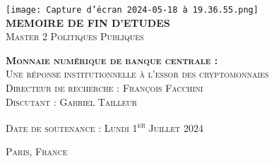 \documentclass[12pt]{article}
\begin{document}
\begin{titlepage}
    \begin{center}
        \vspace*{1cm}

        \texttt{[image: Capture d’écran 2024-05-18 à 19.36.55.png]}\\[2cm] %

        \textsc{\LARGE \textbf {MEMOIRE DE FIN D'ETUDES}}\\[0.1cm]
        \textsc{\Large Master 2 Politiques Publiques}
        \vfill

        \hrulefill

        \vfill

        \textsc{\LARGE \textbf {Monnaie numérique de banque centrale :}}\\[0.2cm]
        \textsc{\Large Une réponse institutionnelle à l'essor des cryptomonnaies}\\[2.5cm]


        \textsc{\Large Directeur de recherche : François Facchini}\\[0.3cm]

        \textsc{\Large Discutant : Gabriel Tailleur}\\[0.5cm]
        \vfill

        \textsc{\large Date de soutenance : Lundi 1\textsuperscript{er} Juillet 2024}\\[1cm]

        \hrulefill

        \vfill

        \textsc{\large Paris, France}\\[0.5cm]

    \end{center}
\end{titlepage}

\tableofcontents


\clearpage

\pagestyle{fancy}
\fancyhf{}

\title{}
\author{Palingwendé Clovis Privat OUEDRAOGO}



\maketitle
\end{document}
